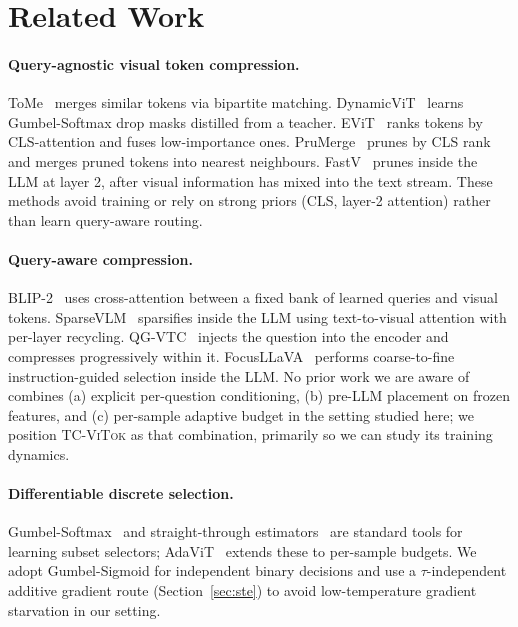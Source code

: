 \documentclass[runningheads]{llncs}
\begin{document}
\section{Related Work}
\label{sec:related}

\paragraph{Query-agnostic visual token compression.}
ToMe~\cite{bolya2022token} merges similar tokens via bipartite
matching. DynamicViT~\cite{rao2021dynamicvit} learns Gumbel-Softmax
drop masks distilled from a teacher. EViT~\cite{liang2022evit} ranks
tokens by CLS-attention and fuses low-importance ones.
PruMerge~\cite{shang2024llava} prunes by CLS rank and merges pruned
tokens into nearest neighbours. FastV~\cite{chen2024fastv} prunes
inside the LLM at layer 2, after visual information has mixed into
the text stream. These methods avoid training or rely on strong
priors (CLS, layer-2 attention) rather than learn query-aware
routing.

\paragraph{Query-aware compression.}
BLIP-2~\cite{li2023blip2} uses cross-attention between a fixed bank of
learned queries and visual tokens. SparseVLM~\cite{zhang2025sparsevlm}
sparsifies inside the LLM using text-to-visual attention with per-layer
recycling. QG-VTC~\cite{li2025qgvtc} injects the question into the
encoder and compresses progressively within it.
FocusLLaVA~\cite{zhu2024focusllava} performs coarse-to-fine
instruction-guided selection inside the LLM. No prior work we are aware
of combines (a) explicit per-question conditioning, (b) pre-LLM
placement on frozen features, and (c) per-sample adaptive budget in the
setting studied here; we position \textsc{TC-ViTok} as that combination,
primarily so we can study its training dynamics.

\paragraph{Differentiable discrete selection.}
Gumbel-Softmax~\cite{jang2017categorical,maddison2017concrete} and
straight-through estimators~\cite{bengio2013estimating} are standard
tools for learning subset selectors;
AdaViT~\cite{meng2022adavit} extends these to per-sample budgets. We
adopt Gumbel-Sigmoid for independent binary decisions and use a
$\tau$-independent additive gradient route (Section~\ref{sec:ste}) to
avoid low-temperature gradient starvation in our setting.
\end{document}
